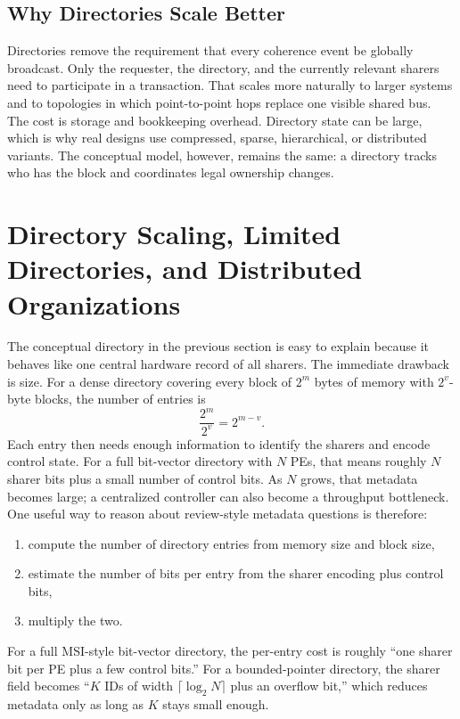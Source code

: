 \subsection*{Why Directories Scale Better}
Directories remove the requirement that every coherence event be globally broadcast.
Only the requester, the directory, and the currently relevant sharers need to participate in a transaction.
That scales more naturally to larger systems and to topologies in which point-to-point hops replace one visible shared bus.
The cost is storage and bookkeeping overhead.
Directory state can be large, which is why real designs use compressed, sparse, hierarchical, or distributed variants.
The conceptual model, however, remains the same: a directory tracks who has the block and coordinates legal ownership changes.


\section[Directory Scaling and Distributed Organizations]{Directory Scaling, Limited Directories, and Distributed Organizations}\label{sec:mp-directory-scaling}
The conceptual directory in the previous section is easy to explain because it behaves like one central hardware record of all sharers.
The immediate drawback is size.
For a dense directory covering every block of $2^m$ bytes of memory with $2^v$-byte blocks, the number of entries is
\[
    \frac{2^m}{2^v}=2^{m-v}.
\]
Each entry then needs enough information to identify the sharers and encode control state.
For a full bit-vector directory with $N$ PEs, that means roughly $N$ sharer bits plus a small number of control bits.
As $N$ grows, that metadata becomes large; a centralized controller can also become a throughput bottleneck.
One useful way to reason about review-style metadata questions is therefore:
\begin{enumerate}
    \item compute the number of directory entries from memory size and block size,
    \item estimate the number of bits per entry from the sharer encoding plus control bits,
    \item multiply the two.
\end{enumerate}
For a full MSI-style bit-vector directory, the per-entry cost is roughly ``one sharer bit per PE plus a few control bits.''
For a bounded-pointer directory, the sharer field becomes ``$K$ IDs of width $\lceil \log_2 N\rceil$ plus an overflow bit,'' which reduces metadata only as long as $K$ stays small enough.

